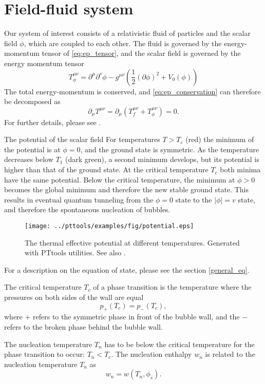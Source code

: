 \section{Field-fluid system}
Our system of interest consists of a relativistic fluid of particles and the scalar field $\phi$,
which are coupled to each other.
The fluid is governed by the energy-momentum tensor of \eqref{eq:ep_tensor},
and the scalar field is governed by the energy momentum tensor
\cites[eq. 5.12]{lecture_notes}[eq. 2.9]{hindmarsh_gw_pt_2019}
\begin{equation}
T_\phi^{\mu \nu}
= \partial^\mu \partial^\nu \phi
- g^{\mu \nu} \left(\frac{1}{2} (\partial \phi)^2 + V_0 (\phi) \right)
\label{eq:ep_tensor_field}
\end{equation}
The total energy-momentum is conserved, and \ref{eq:ep_conservation} can therefore be decomposed as
\cite[eq. 5.17]{lecture_notes}
\begin{equation}
\partial_\mu T^{\mu \nu} = \partial_\mu (T_f^{\mu \nu} + T_\phi^{\mu \nu}) = 0.
\label{eq:ep_conservation_total}
\end{equation}
For further details, please see \cite{moore_pt_1995}.

The potential of the scalar field
For temperatures $T > T_c$ (red) the minimum of the potential is at $\phi = 0$, and the ground state is symmetric.
As the temperature decreases below $T_1$ (dark green), a second minimum develops, but its potential is higher than that of the ground state.
At the critical temperature $T_c$ both minima have the same potential.
Below the critical temperature, the minimum at $\phi > 0$ becomes the global minimum and therefore the new stable ground state.
This results in eventual quantum tunneling from the $\phi = 0$ state to the $|\phi| = v$ state,
and therefore the spontaneous nucleation of bubbles.

\begin{figure}[ht!]
\centering
\texttt{[image: ../pttools/examples/fig/potential.eps]}
\caption{The thermal effective potential at different temperatures. Generated with PTtools utilities. See also \cite[fig. 4]{lecture_notes}.}
\label{fig:potential}
\end{figure}


For a description on the equation of state, please see the section \ref{general_eq}.

The critical temperature $T_c$ of a phase transition is the temperature where the pressures on both sides of the wall are equal
\begin{equation}
p_+(T_c) = p_-(T_c),
\label{eq:critical_temp}
\end{equation}
where $+$ refers to the symmetric phase in front of the bubble wall,
and the $-$ refers to the broken phase behind the bubble wall.

The nucleation temperature $T_n$ has to be below the critical temperature for the phase transition to occur: $T_n < T_c$.
The nucleation enthalpy $w_n$ is related to the nucleation temperature $T_n$ as
\begin{equation}
w_n = w(T_n,\phi_s).
\label{eq:wn}
\end{equation}
